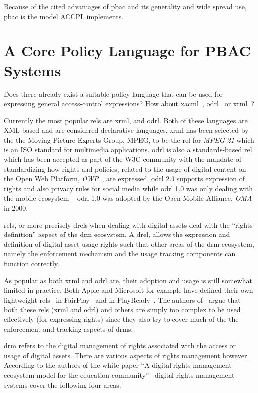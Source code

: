 Because of the cited advantages of \ac{pbac} and its generality and wide spread use, \ac{pbac} is the model \ac{ACCPL} implements.

\section{A Core Policy Language for PBAC Systems} 

Does there already exist a suitable policy language that can be used for expressing general access-control expressions? How about \ac{xacml}~\cite{xacml3pdf}, \ac{odrl}~\cite{odrloneone} or \ac{xrml}~\cite{Wang}? 

Currently the most popular \ac{rel}s are \ac{xrml}, and \ac{odrl}. Both of these languages are XML based and are considered declarative languages. \ac{xrml} has been selected by the the Moving Picture Experts Group, MPEG, to be the \ac{rel} for \emph{MPEG-21} which is an ISO standard for multimedia applications. \ac{odrl} is also a standards-based \ac{rel} which has been accepted as part of the W3C community with the mandate of standardizing how rights and policies, related to the usage of digital content on the Open Web Platform, \emph{OWP}~\cite{openwebplatform}, are expressed. \ac{odrl} 2.0 supports expression of rights and also privacy rules for social media while \ac{odrl} 1.0 was only dealing with the mobile ecosystem -- \ac{odrl} 1.0 was adopted by the Open Mobile Alliance, \emph{OMA} in 2000.

\ac{rel}s, or more precisely \ac{drel}s when dealing with digital assets deal with the ``rights definition'' aspect of the \ac{drm} ecosystem. A \ac{drel}, allows the expression and definition of digital asset usage rights such that other areas of the \ac{drm} ecosystem, namely the enforcement mechanism and the usage tracking components can function correctly.

As popular as both \ac{xrml} and \ac{odrl} are, their adoption and usage is still somewhat limited in practice. Both Apple and Microsoft for example have defined their own lightweight \ac{rel}s~\cite{problemwithrels} in FairPlay~\cite{fairplay} and in PlayReady~\cite{playready}. The authors of~\cite{problemwithrels} argue that both these \ac{rel}s (\ac{xrml} and \ac{odrl}) and others are simply too complex to be used effectively (for expressing rights) since they also try to cover much of the the enforcement and tracking aspects of \ac{drm}s.

\ac{drm} refers to the digital management of rights associated with the access or usage of digital assets. There are various aspects of rights management however. According to the authors of the white paper ``A digital rights management ecosystem model for the education community''~\cite{collier} digital rights management systems cover the following four areas: 

